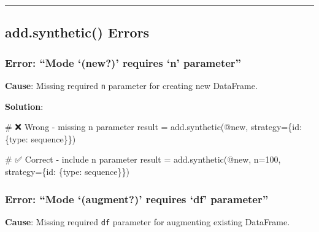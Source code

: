 \documentclass[
  letterpaper,
]{scrbook}
\newenvironment{Shaded}{\begin{snugshade}}{\end{snugshade}}
\newcommand{\CommentTok}[1]{\textcolor[rgb]{0.37,0.37,0.37}{#1}}
\newcommand{\DecValTok}[1]{\textcolor[rgb]{0.68,0.00,0.00}{#1}}
\newcommand{\NormalTok}[1]{\textcolor[rgb]{0.00,0.23,0.31}{#1}}
\newcommand{\OperatorTok}[1]{\textcolor[rgb]{0.37,0.37,0.37}{#1}}
\newcommand{\StringTok}[1]{\textcolor[rgb]{0.13,0.47,0.30}{#1}}
\begin{document}
\begin{center}\rule{0.5\linewidth}{0.5pt}\end{center}

\subsection{add.synthetic() Errors}\label{add.synthetic-errors}

\subsubsection{\texorpdfstring{Error: ``Mode `(\textbf{new?})' requires
`n'
parameter''}{Error: ``Mode `(new?)' requires `n' parameter''}}\label{error-mode-new-requires-n-parameter}

\textbf{Cause}: Missing required \texttt{n} parameter for creating new
DataFrame.

\textbf{Solution}:

\begin{Shaded}
\begin{Highlighting}[]
\CommentTok{\# ❌ Wrong {-} missing n parameter}
\NormalTok{result }\OperatorTok{=}\NormalTok{ add.synthetic(}\StringTok{\textquotesingle{}@new\textquotesingle{}}\NormalTok{, strategy}\OperatorTok{=}\NormalTok{\{}\StringTok{\textquotesingle{}id\textquotesingle{}}\NormalTok{: \{}\StringTok{\textquotesingle{}type\textquotesingle{}}\NormalTok{: }\StringTok{\textquotesingle{}sequence\textquotesingle{}}\NormalTok{\}\})}

\CommentTok{\# ✅ Correct {-} include n parameter}
\NormalTok{result }\OperatorTok{=}\NormalTok{ add.synthetic(}\StringTok{\textquotesingle{}@new\textquotesingle{}}\NormalTok{, n}\OperatorTok{=}\DecValTok{100}\NormalTok{, strategy}\OperatorTok{=}\NormalTok{\{}\StringTok{\textquotesingle{}id\textquotesingle{}}\NormalTok{: \{}\StringTok{\textquotesingle{}type\textquotesingle{}}\NormalTok{: }\StringTok{\textquotesingle{}sequence\textquotesingle{}}\NormalTok{\}\})}
\end{Highlighting}
\end{Shaded}

\subsubsection{\texorpdfstring{Error: ``Mode `(\textbf{augment?})'
requires `df'
parameter''}{Error: ``Mode `(augment?)' requires `df' parameter''}}\label{error-mode-augment-requires-df-parameter}

\textbf{Cause}: Missing required \texttt{df} parameter for augmenting
existing DataFrame.
\end{document}
